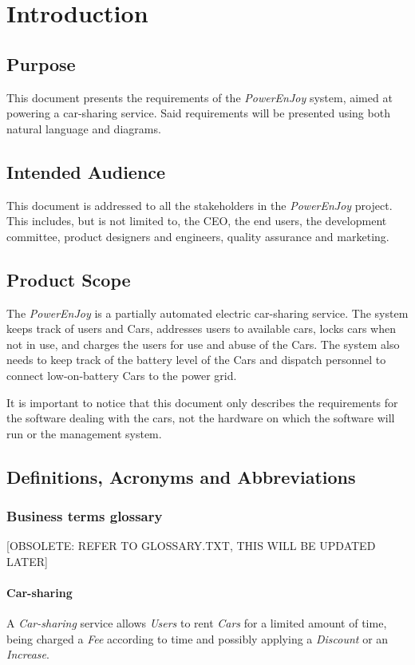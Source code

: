 \maketitle
\clearpage
\tableofcontents

\clearpage\section{Introduction}
\subsection{Purpose}
This document presents the requirements of the \emph{PowerEnJoy} system, aimed at powering a car-sharing service. Said requirements will be presented using both natural language and diagrams.
\subsection{Intended Audience}
This document is addressed to all the stakeholders in the \emph{PowerEnJoy} project. This includes, but is not limited to, the CEO, the end users, the development committee, product designers and engineers, quality assurance and marketing.
\subsection{Product Scope}
The \emph{PowerEnJoy} is a partially automated electric car-sharing service. The system keeps track of users and Cars, addresses users to available cars, locks cars when not in use, and charges the users for use and abuse of the Cars. The system also needs to keep track of the battery level of the Cars and dispatch personnel to connect low-on-battery Cars to the power grid.

It is important to notice that this document only describes the requirements for the software dealing with the cars, not the hardware on which the software will run or the management system.
\subsection{Definitions, Acronyms and Abbreviations}
\subsubsection{Business terms glossary}
[OBSOLETE: REFER TO GLOSSARY.TXT, THIS WILL BE UPDATED LATER]
\paragraph{Car-sharing}
A \emph{Car-sharing} service allows \emph{Users} to rent \emph{Cars} for a limited amount of time, being charged a \emph{Fee} according to time and possibly applying a \emph{Discount} or an \emph{Increase}.
